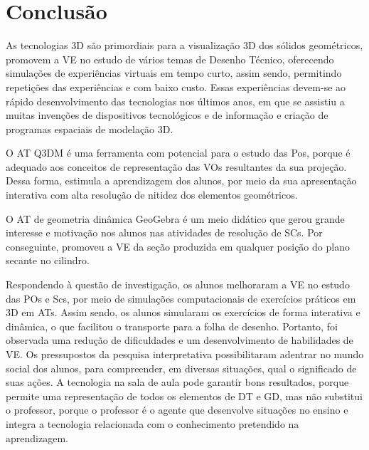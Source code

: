 \section{Conclusão}\label{sec-conclusão}

As tecnologias 3D são primordiais para a visualização 3D dos sólidos
geométricos, promovem a VE no estudo de vários temas de Desenho Técnico,
oferecendo simulações de experiências virtuais em tempo curto, assim
sendo, permitindo repetições das experiências e com baixo custo. Essas
experiências devem-se ao rápido desenvolvimento das tecnologias nos
últimos anos, em que se assistiu a muitas invenções de dispositivos
tecnológicos e de informação e criação de programas espaciais de
modelação 3D.

O AT Q3DM é uma ferramenta com potencial para o estudo das Pos, porque é
adequado aos conceitos de representação das VOs resultantes da sua
projeção. Dessa forma, estimula a aprendizagem dos alunos, por meio da
sua apresentação interativa com alta resolução de nitidez dos elementos
geométricos.

O AT de geometria dinâmica GeoGebra é um meio didático que gerou grande
interesse e motivação nos alunos nas atividades de resolução de SCs. Por
conseguinte, promoveu a VE da seção produzida em qualquer posição do
plano secante no cilindro.

Respondendo à questão de investigação, os alunos melhoraram a VE no
estudo das POs e Scs, por meio de simulações computacionais de
exercícios práticos em 3D em ATs. Assim sendo, os alunos simularam os
exercícios de forma interativa e dinâmica, o que facilitou o transporte
para a folha de desenho. Portanto, foi observada uma redução de
dificuldades e um desenvolvimento de habilidades de VE. Os pressupostos
da pesquisa interpretativa possibilitaram adentrar no mundo social dos
alunos, para compreender, em diversas situações, qual o significado de
suas ações. A tecnologia na sala de aula pode garantir bons resultados,
porque permite uma representação de todos os elementos de DT e GD, mas
não substitui o professor, porque o professor é o agente que desenvolve
situações no ensino e integra a tecnologia relacionada com o
conhecimento pretendido na aprendizagem.


